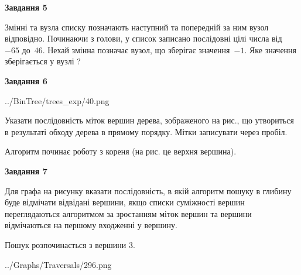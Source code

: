 \documentclass[12pt, ukrainian]{article}
\begin{document}
{\begin {large}
{\begin {center}\textbf{Завдання 5}\end {center}}\par
Змінні  та  вузла списку позначають наступний та попередній за ним вузол відповідно. Починаючи з голови, у список записано послідовні цілі числа від~$-65$ до~$46$. Нехай змінна  позначає вузол, що зберігає значення~$-1$.
Яке значення зберігається у вузлі  ?\par
\newpage

{\begin {center}\textbf{Завдання 6}\end {center}}\par

\begin{center}
	{../BinTree/trees_exp/40.png}
\end{center}
Указати послідовність міток вершин дерева, зображеного на рис., що утвориться в результаті обходу дерева в прямому порядку. Мітки записувати через пробіл.\par Алгоритм починає роботу з кореня (на рис. це верхня вершина).\par
\newpage

{\begin {center}\textbf{Завдання 7}\end {center}}\par
Для графа на рисунку вказати послідовність, в якій алгоритм пошуку в глибину буде відмічати відвідані вершини, якщо списки суміжності вершин переглядаються алгоритмом за зростанням міток вершин та вершини відмічаються на першому вход\-женні у вершину.\par
Пошук розпочинається з вершини 3.\par

\begin{center}
	{../Graphs/Traversals/296.png}
\end{center}\par
\newpage


\end{large}}
\end{document}
